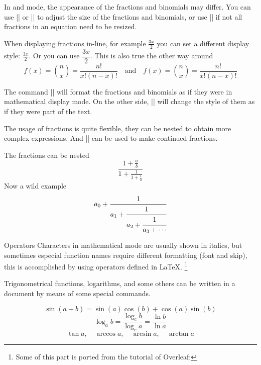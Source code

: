 \begin{frame}[fragile]

In  and  mode, the appearance of the fractions and binomials may differ. You can use \LC|\displaystyle| or \LC|\textstyle| to adjust the size of the fractions and binomials, or use \LC|\dfrac| if not all fractions in an equation need to be resized.

\begin{latexexample}
When displaying fractions in-line, for example $\frac{3x}{2}$
you can set a different display style:  $ \displaystyle \frac{3x}{2} $.
Or you can use $\dfrac{3x}{2}$. This is also true the other way around
\[ f(x)=\binom{n}{x}=\frac{n!}{x!(n-x)!} \quad \textrm{and} \quad
   f(x)=\textstyle\binom{n}{x}=\frac{n!}{x!(n-x)!} \]
\end{latexexample}

The command \LC|\displaystyle| will format the fractions and binomials as if they were in mathematical display mode. On the other side, \LC|\textstyle| will change the style of them as if they were part of the text.

\end{frame}

\begin{frame}[fragile]

The usage of fractions is quite flexible, they can be nested to obtain more complex expressions. And \LC|\cfrac| can be used to make continued fractions.

\begin{latexexample}
The fractions can be nested
\[ \frac{1+\frac{a}{b}}{1+\frac{1}{1+\frac{1}{a}}} \]
Now a wild example
\[ a_0+\cfrac{1}{a_1+\cfrac{1}{a_2+\cfrac{1}{a_3+\cdots}}} \]
\end{latexexample}

\end{frame}

\begin{frame}[fragile]{Operators}
Characters in mathematical mode are usually shown in italics, but sometimes especial function names require different formatting (font and skip), this is accomplished by using operators defined in \LaTeX. \footnote[1]{Some of this part is ported from the tutorial of Overleaf: }\medskip

Trigonometrical functions, logarithms, and some others can be written in a document by means of some special commands. 

\begin{latexexample}
\[ \sin(a + b ) = \sin(a)\cos(b) + \cos(a)\sin(b) \]
\[ \log_a b = \frac{\log_c b}{\log_c a} = \frac{\ln b}{\ln a} \]
\[ \tan a,\quad \arccos a,\quad \arcsin a,\quad \arctan a \]
\end{latexexample}

\end{frame}

